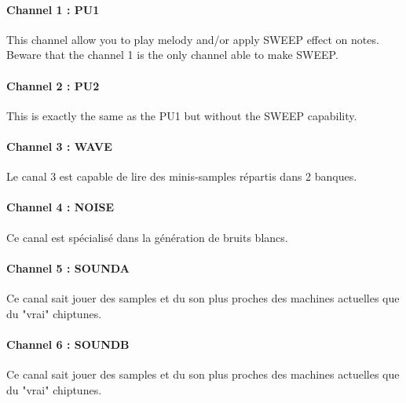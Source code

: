 \documentclass[12pt,a4paper]{article}
\begin{document}
    \paragraph{Channel 1 : PU1} This channel allow you to play melody and/or apply SWEEP effect on notes. Beware that the channel 1 is the only channel able to make SWEEP.


    \paragraph{Channel 2 : PU2} This is exactly the same as the PU1 but without the SWEEP capability.


        \paragraph{Channel 3 : WAVE} Le canal 3 est capable de lire des minis-samples répartis dans 2 banques.


        \paragraph{Channel 4 : NOISE} Ce canal est spécialisé dans la génération de bruits blancs.


        \paragraph{Channel 5 : SOUNDA} Ce canal sait jouer des samples et du son plus proches des machines actuelles que du "vrai" chiptunes.


        \paragraph{Channel 6 : SOUNDB} Ce canal sait jouer des samples et du son plus proches des machines actuelles que du "vrai" chiptunes.
\end{document}
